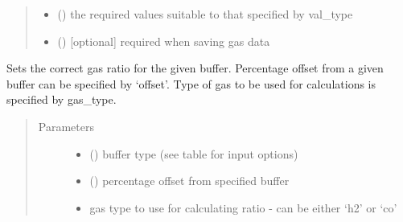 \documentclass[letterpaper,10pt,english]{sphinxmanual}
\begin{document}
\begin{fulllineitems}
\begin{fulllineitems}
\begin{quote}
\begin{description}
\begin{itemize}
\item {} 
 () \textendash{} the required values suitable to that specified by val\_type

\item {} 
 () \textendash{} {[}optional{]} required when saving gas data

\end{itemize}

\end{description}\end{quote}

\end{fulllineitems}


\begin{fulllineitems}
\label{\detokenize{laboratory:laboratory.Setup.set_fugacity}}
Sets the correct gas ratio for the given buffer. Percentage offset from a given buffer can be specified by ‘offset’. Type of gas to be used for calculations is specified by gas\_type.
\begin{quote}\begin{description}
\item[{Parameters}] \leavevmode\begin{itemize}
\item {} 
 () \textendash{} buffer type (see table for input options)

\item {} 
 (\sphinxstyleliteralemphasis{\sphinxupquote{, }}) \textendash{} percentage offset from specified buffer

\item {} 
 \textendash{} gas type to use for calculating ratio - can be either ‘h2’ or ‘co’

\end{itemize}


\end{description}
\end{quote}
\end{fulllineitems}
\end{fulllineitems}
\end{document}
